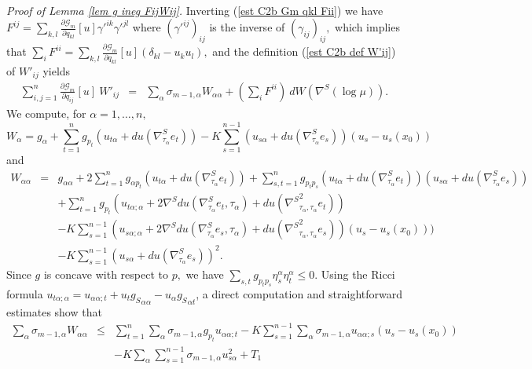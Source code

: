 \documentclass[10pt,reqno,oneside]{amsart}
\theoremstyle{definition}
\theoremstyle{remark}
\begin{document}
\\\textit{Proof of Lemma \ref{lem g ineg FijWij}.} 
Inverting (\ref{est C2b Gm qkl Fii}) we have $F^{ij}=\sum_{k,l}\frac{\partial\mathcal{G}_m}{\partial q_{kl}}[u] {\gamma'}^{ik}{\gamma'}^{jl}$ where $({\gamma'}^{ij})_{ij}$ is the inverse of $(\gamma_{ij})_{ij},$ which implies that $\sum_{i}F^{ii}=\sum_{k,l}\frac{\partial\mathcal{G}_m}{\partial q_{kl}}[u] (\delta_{kl}-u_ku_l),$ and the definition (\ref{est C2b def W'ij}) of $W'_{ij}$ yields
\begin{eqnarray*}
\sum_{i,j=1}^n\frac{\partial \mathcal{G}_m}{\partial q_{ij}}[u]\ W'_{ij}&=&\sum_{\alpha}\sigma_{m-1,\alpha}W_{\alpha\alpha}+(\sum_{i}F^{ii})\ dW(\nabla^S(\log\mu)).
\end{eqnarray*}
We compute, for $\alpha=1,\ldots, n,$
\begin{equation}\label{expr Walpha}
W_{\alpha}=g_\alpha+\sum_{t=1}^ng_{p_t}\left(u_{t\alpha}+du(\nabla^S_{\tau_\alpha}e_t)\right)-K\sum_{s=1}^{n-1}\left(u_{s\alpha}+du(\nabla^S_{\tau_\alpha}e_s)\right)(u_s-u_s(x_0))
\end{equation}
and
\begin{eqnarray}
W_{\alpha\alpha}&=&g_{\alpha\alpha}+2\sum_{t=1}^ng_{\alpha p_t}\left(u_{t\alpha}+du(\nabla^S_{\tau_\alpha}e_t)\right)+\sum_{s,t=1}^ng_{p_t p_s}\left(u_{t\alpha}+du(\nabla^S_{\tau_\alpha}e_t)\right)\left(u_{s\alpha}+du(\nabla^S_{\tau_\alpha}e_s)\right)\nonumber\\
&&+\sum_{t=1}^ng_{p_t}\left(u_{t\alpha;\alpha}+2\nabla^S du(\nabla^S_{\tau_\alpha}e_t,\tau_{\alpha})+du({\nabla^{S}}^2_{\tau_\alpha,\tau_\alpha}e_t)\right)\nonumber\\
&&-K\sum_{s=1}^{n-1}\left(u_{s\alpha;\alpha}+2\nabla^S du(\nabla^S_{\tau_\alpha}e_s,\tau_{\alpha})+du({\nabla^S}^2_{\tau_\alpha,\tau_\alpha}e_s)\right)(u_s-u_s(x_0)))\nonumber\\
&&-K\sum_{s=1}^{n-1}\left(u_{s\alpha}+du(\nabla^S_{\tau_{\alpha}}e_s)\right)^2.\label{eqn Walphaalpha}
\end{eqnarray}
Since $g$ is concave with respect to $p,$ we have $\sum_{s,t}g_{p_tp_s}\eta^{\alpha}_s\eta^{\alpha}_t\leq 0.$ Using the Ricci formula $u_{t\alpha;\alpha}=u_{\alpha\alpha; t}+u_t{g_S}_{\alpha\alpha}-u_{\alpha}{g_S}_{\alpha t}$, a direct computation and straightforward estimates show that
\begin{eqnarray*}
\sum_{\alpha}\sigma_{m-1,\alpha}W_{\alpha\alpha}&\leq &\sum_{t=1}^n\sum_{\alpha}\sigma_{m-1,\alpha}g_{p_t}u_{\alpha\alpha;t}-K\sum_{s=1}^{n-1}\sum_{\alpha}\sigma_{m-1,\alpha}u_{\alpha\alpha;s}(u_s-u_s(x_0))\\
&&-K\sum_{\alpha}\sum_{s=1}^{n-1}\sigma_{m-1,\alpha}u_{s\alpha}^2+T_1
\end{eqnarray*}
\end{document}
